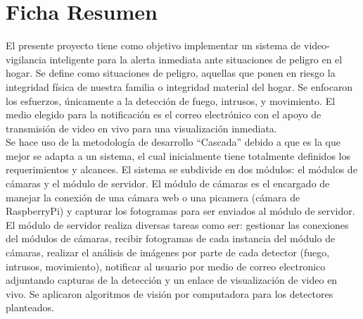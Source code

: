 \chapter{Ficha Resumen}

El presente proyecto tiene como objetivo implementar un sistema de video-vigilancia inteligente para la alerta inmediata ante situaciones de peligro en el hogar. Se define como situaciones de peligro, aquellas que ponen en riesgo la integridad física de nuestra familia o integridad material del hogar. Se enfocaron los esfuerzos, únicamente a la detección de fuego, intrusos, y movimiento. El medio elegido para la notificación es el correo electrónico con el apoyo de transmisión de video en vivo para una visualización inmediata.\\

Se hace uso de la metodología de desarrollo ``Cascada'' debido a que es la que mejor se adapta a un sistema, el cual inicialmente tiene totalmente definidos los requerimientos y alcances. El sistema se subdivide en dos módulos: el módulos de cámaras y el módulo de servidor.  El módulo de cámaras es el encargado de manejar la conexión de una cámara web o una picamera (cámara de RaspberryPi) y capturar los fotogramas para ser enviados al módulo de servidor. El módulo de servidor realiza diversas tareas como ser: gestionar las conexiones del módulos de cámaras, recibir fotogramas de cada instancia del módulo de cámaras, realizar el análisis de imágenes por parte de cada detector (fuego, intrusos, movimiento), notificar al usuario por medio de correo electronico adjuntando capturas de la detección y un enlace de visualización de video en vivo. Se aplicaron algoritmos de visión por computadora para los detectores planteados.\\